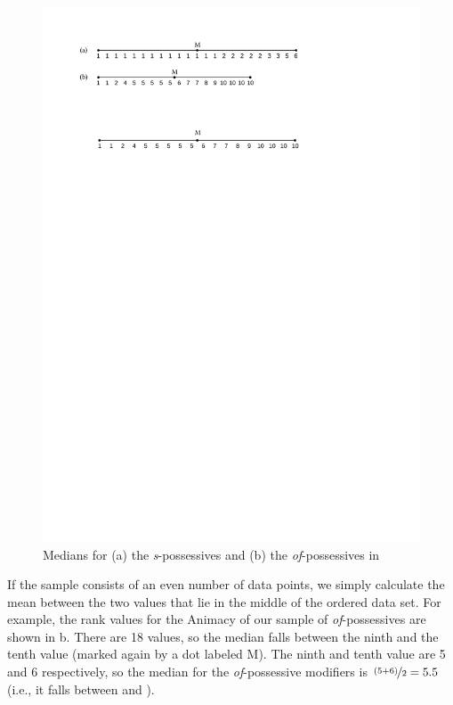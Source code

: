 \begin{figure}
\caption{Medians for (a) the \textit{s}-possessives and (b) the \textit{of}-possessives in }
\label{fig:possmedians}
\includegraphics{figures/medians}
\end{figure}

If the sample consists of an even number of data points, we simply calculate the mean  between the two values that lie in the middle of the ordered data set. For example, the rank values for the Animacy  of our sample of \textit{of}-possessives  are shown in b. There are 18 values, so the median  falls between the ninth and the tenth value (marked again by a dot labeled M). The ninth and tenth value are 5 and 6 respectively, so the median for the \textit{of}-possessive modifiers is $\nicefrac{(5+6)}{2} = 5.5$ (i.e., it falls between  and ).

